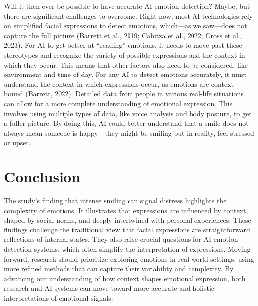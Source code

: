 \documentclass[authordate, reflection,issue]{jote-new-article}
\begin{document}
	Will it then ever be possible to have accurate AI emotion detection? Maybe, but there are significant challenges to overcome. Right now, most AI technologies rely on simplified facial expressions to detect emotions, which—as we saw—does not capture the full picture (Barrett et al., 2019; Cabitza et al., 2022; Cross et al., 2023). For AI to get better at “reading” emotions, it needs to move past these stereotypes and recognize the variety of possible expressions and the context in which they occur. This means that other factors also need to be considered, like environment and time of day. For any AI to detect emotions accurately, it must understand the context in which expressions occur, as emotions are context-bound (Barrett, 2022). Detailed data from people in various real-life situations can allow for a more complete understanding of emotional expression. This involves using multiple types of data, like voice analysis and body posture, to get a fuller picture. By doing this, AI could better understand that a smile does not always mean someone is happy—they might be smiling but in reality, feel stressed or upset.







	\section{Conclusion}



	The study's finding that intense smiling can signal distress highlights the complexity of emotions. It illustrates that expressions are influenced by context, shaped by social norms, and deeply intertwined with personal experiences. These findings challenge the traditional view that facial expressions are straightforward reflections of internal states. They also raise crucial questions for AI emotion-detection systems, which often simplify the interpretation of expressions. Moving forward, research should prioritize exploring emotions in real-world settings, using more refined methods that can capture their variability and complexity. By advancing our understanding of how context shapes emotional expression, both research and AI systems can move toward more accurate and holistic interpretations of emotional signals.
\end{document}
